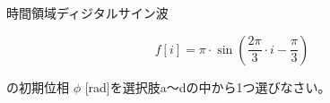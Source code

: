 時間領域ディジタルサイン波 

\[
f[i] = \pi \cdot \sin \left ( \frac{2 \pi}{3}  \cdot i - \frac{\pi}{3} \right )
\]

\noindent の初期位相 $\phi$ [rad]を選択肢a〜dの中から1つ選びなさい。
